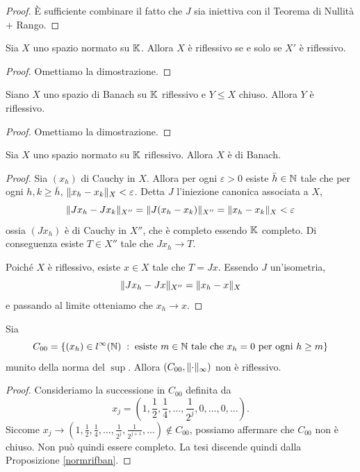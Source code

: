 \begin{proof}
	È sufficiente combinare il fatto che $J$ sia iniettiva con il Teorema di Nullità + Rango.
\end{proof}
\begin{teorema}
	Sia $X$ uno spazio normato su $\mathbb{K}$. Allora $X$ è riflessivo se e solo se $X'$ è riflessivo.
\end{teorema}
\begin{proof}
	Omettiamo la dimostrazione.
\end{proof}
\begin{teorema}
	Siano $X$ uno spazio di Banach su $\mathbb{K}$ riflessivo e $Y \le X$ chiuso. Allora $Y$ è riflessivo.
\end{teorema}
\begin{proof}
	Omettiamo la dimostrazione.
\end{proof}
\begin{proposizione}\label{normrifban}
	Sia $X$ uno spazio normato su $\mathbb{K}$ riflessivo. Allora $X$ è di Banach.
\end{proposizione}
\begin{proof}
	Sia $(x_{h})$ di Cauchy in $X$. Allora per ogni $\varepsilon > 0$ esiste $\bar{h} \in \mathbb{N}$ tale che per ogni $h,k \ge \bar{h}$, $\lVert x_{h}- x_{k}\rVert_{X}<\varepsilon$. Detta $J$ l'iniezione canonica associata a $X$,
	\[ \lVert Jx_{h} - Jx_{k}\rVert_{X''} = \lVert J(x_{h} - x_{k})\rVert_{X''} = \lVert x_{h} - x_{k}\rVert_{X} < \varepsilon \]
	ossia $(Jx_{h})$ è di Cauchy in $X''$, che è completo essendo $\mathbb{K}$ completo. Di conseguenza esiste $T \in X''$ tale che $Jx_{h} \to T$. 
	
	Poiché $X$ è riflessivo, esiste $x \in X $ tale che $T = Jx$. Essendo $J$ un'isometria,
	\[ \lVert Jx_{h} - Jx\rVert_{X''} = \lVert x_{h} - x\rVert_{X}\]
	e passando al limite otteniamo che $x_{h} \to x$.
\end{proof}
\begin{esempio}
	Sia 
	\[ C_{00}= \left\lbrace (x_{h}) \in l^{\infty}(\mathbb{N}) \;:\; \textup{esiste } m \in \mathbb{N} \textup{ tale che } x_{h} = 0 \textup{ per ogni } h \ge m\right\rbrace \]
	munito della norma del $\sup$. Allora $(C_{00},\lVert\cdot\rVert_\infty)$ non è riflessivo. 
\end{esempio}
\begin{proof}
	Consideriamo la successione in $C_{00}$ definita da
	\[ x_{j} = (1,\frac{1}{2},\frac{1}{4}, \dots, \frac{1}{2^{j}}, 0, \dots, 0, \dots). \]
	Siccome $x_{j} \to (1,\frac{1}{2},\frac{1}{4}, \dots, \frac{1}{2^{j}}, \frac{1}{2^{j+1}}, \dots) \notin C_{00}$, possiamo affermare che $C_{00}$ non è chiuso. Non può quindi essere completo. La tesi discende quindi dalla Proposizione \eqref{normrifban}.
\end{proof}
